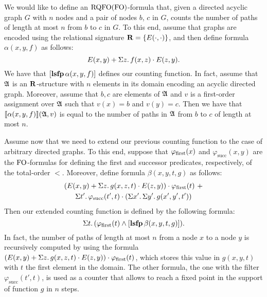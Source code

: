 \begin{example} \label{ex:count-path}
We would like to define an ${\rm RQFO}({\rm FO})$-formula that, given a directed acyclic graph $G$ with $n$ nodes and a pair of nodes $b$, $c$ in $G$, counts the number of paths of length at most $n$ from $b$ to $c$ in $G$. To this end, assume that graphs are encoded using the relational signature $\mathbf{R} = \{ E(\cdot,\cdot) \}$, and then define formula $\alpha(x, y, f)$ as follows:
$$
E(x,y) + \Sigma{z}.\, f(x,z)\cdot E(z,y).
$$
We have that $[{\bf lsfp} \, \alpha(x,y,f)]$ defines our counting function. In fact, assume that $\mathfrak{A}$ is an $\mathbf{R}$-structure with $n$ elements in its domain encoding an acyclic directed graph. Moreover, assume that $b,c$ are elements of $\mathfrak{A}$ and $v$ is a first-order assignment over $\mathfrak{A}$ such that $v(x) = b$ and $v(y) = c$. Then we have that ${\llbracket{}{\alpha(x,y,f)}\rrbracket}(\mathfrak{A},v)$ is equal to the  number of paths in $\mathfrak{A}$ from $b$ to $c$ of length at most $n$.

Assume now that we need to extend our previous counting function to the case of arbitrary directed graphs. To this end, suppose that $\varphi_{\text{\rm first}}(x)$ and $\varphi_{\text{succ}}(x,y)$ are the ${\rm FO}$-formulas for defining the first and successor predicates, respectively, of the total-order $<$. Moreover, define formula $\beta(x, y, t, g)$ as follows:
\begin{multline*}
(E(x,y) + \Sigma{z}.\, g(x,z,t)\cdot E(z,y)) \cdot \varphi_{\text{\rm first}}(t) \ +\\
\Sigma{t'}.\, \varphi_{\text{succ}}(t',t) \cdot \left(\Sigma{x'}.\, \Sigma{y'}.\, g(x',y',t') \right)
\end{multline*}
Then our extended counting function is defined by the following formula:
$$
\Sigma{t}.\, (\varphi_{\text{\rm first}}(t) \wedge [{\bf lsfp} \, \beta(x,y,t,g)]).
$$ 
In fact, the number of paths of length at most $n$ from a node $x$ to a node $y$ is recursively computed by using the formula $(E(x,y) + \Sigma{z}.\, g(x,z,t)\cdot E(z,y)) \cdot \varphi_{\text{\rm first}}(t)$, which stores this value in $g(x,y,t)$ with $t$ the first element in the domain.  The other formula, the one with the filter $\varphi_{\text{succ}}(t',t)$, is used as a counter that allows to reach a fixed point in the support of function $g$ in $n$ steps.
\end{example}
%
%
